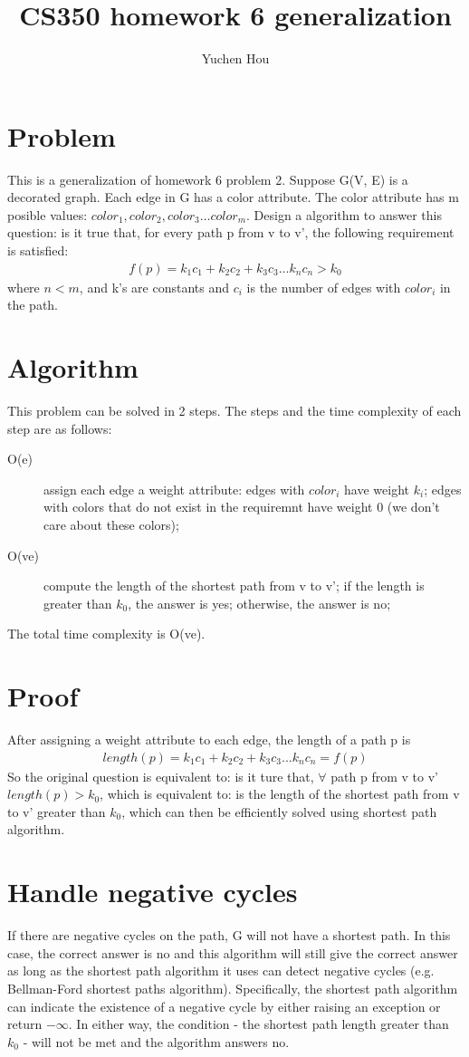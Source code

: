 \documentclass{article}
\begin{document}
\lstset{language=Java, tabsize=4}
\title{CS350 homework 6 generalization}
\author{Yuchen Hou}
\maketitle
\section{Problem}
This is a generalization of homework 6 problem 2. Suppose G(V, E) is a decorated
graph. Each edge in G has a color attribute. The color attribute has m posible
values: $color_1, color_2, color_3 \ldots color_m$. Design a algorithm to
answer this question: is it true that, for every path p from v to v', the
following requirement is satisfied:
\begin{align*}
f(p) = k_1c_1 + k_2c_2 + k_3c_3 \ldots k_nc_n > k_0
\end{align*}
where $n < m$, and k's are constants and $c_i$ is the number of edges with
$color_i$ in the path.
\section{Algorithm}
This problem can be solved in 2 steps. The steps and the time complexity of each
step are as follows:
\begin{description}
  \item[O(e)] assign each edge a weight attribute: edges with $color_i$ have
  weight $k_i$; edges with colors that do not exist in the requiremnt have
  weight 0 (we don't care about these colors);
  \item[O(ve)] compute the length of the shortest path from v to v'; if the
  length is greater than $k_0$, the answer is yes; otherwise, the answer is no;
\end{description}
The total time complexity is O(ve).
\section{Proof}
After assigning a weight attribute to each edge, the
length of a path p is
\begin{align*}
length(p) = k_1c_1 + k_2c_2 + k_3c_3 ... k_nc_n = f(p)
\end{align*}
So the original question is equivalent to: is it ture that, $\forall$ path p
from v to v' $length(p) > k_0$, which is equivalent to: is the length
of the shortest path from v to v' greater than $k_0$, which can then be
efficiently solved using shortest path algorithm.
\section{Handle negative cycles}
If there are negative cycles on the path, G will not have a shortest path. In
this case, the correct answer is no and this algorithm will still give the
correct answer as long as the shortest path algorithm it uses can detect negative cycles (e.g.
Bellman-Ford shortest paths algorithm). Specifically, the shortest path
algorithm can indicate the existence of a negative cycle by either raising an
exception or return $-\infty$. In either way, the condition - the shortest
path length greater than $k_0$ - will not be met and the algorithm answers no.
\end{document}
